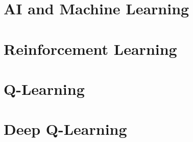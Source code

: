 \section{AI and Machine Learning}

\section{Reinforcement Learning}

\section{Q-Learning}


\section{Deep Q-Learning}


